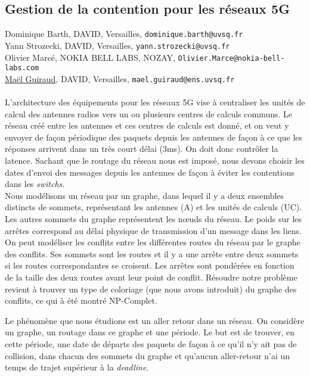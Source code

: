 \documentclass[a4paper,titlepage,12pt,normalheadings,makeidx]{article}
\begin{document}
\newpage

\subsection*{Gestion de la contention pour les réseaux 5G}


Dominique Barth, DAVID, Versailles,
\texttt{dominique.barth@uvsq.fr}\\
\indent
Yann Strozecki, DAVID, Versailles,
\texttt{yann.strozecki@uvsq.fr}\\
\indent
Olivier Marcé, NOKIA BELL LABS, NOZAY,
\texttt{Olivier.Marce@nokia-bell-labs.com}\\
\indent
\underline{Maël Guiraud}, DAVID, Versailles,
\texttt{mael.guiraud@ens.uvsq.fr}\\
\\

L'architecture des équipements pour les réseaux 5G vise à centraliser les unités de calcul des antennes radios vers un ou plusieurs centres de calculs communs. Le réseau créé entre les antennes et ces centres de calculs est donné, et on veut y envoyer de façon périodique des paquets depuis les antennes de façon à ce que les réponses arrivent dans un très court délai (3ms). On doit donc contrôler la latence. Sachant que le routage du réseau nous est imposé, nous devons choisir les dates d'envoi des messages depuis les antennes de façon à éviter les contentions dans les \textit{switchs}.  \\

Nous modélisons un réseau par un graphe, dans lequel il y a deux ensembles distincts de sommets, représentant les antennes (A) et les unités de calculs (UC). Les autres sommets du graphe représentent les nœuds du réseau. Le poids sur les arrêtes correspond au délai physique de transmission d'un message dans les liens.
On peut modéliser les conflits entre les différentes routes du réseau par le graphe des conflits. Ses sommets sont les routes et il y a une arrête entre deux sommets si les routes correspondantes se croisent.
Les arrêtes sont pondérées en fonction de la taille des deux routes avant leur point de conflit.
Résoudre notre problème revient à trouver un type de coloriage (que nous avons introduit) du graphe des conflits, ce qui à été montré NP-Complet.

Le phénomène que nous étudions est un aller retour dans un réseau. On considère un graphe, un routage dans ce graphe et une période. Le but est de trouver, en cette période, une date de départs des paquets de façon à ce qu'il n'y ait pas de collision, dans chacun des sommets du graphe et qu'aucun aller-retour n'ai un temps de trajet supérieur à la \textit{deadline}.\\
\end{document}
